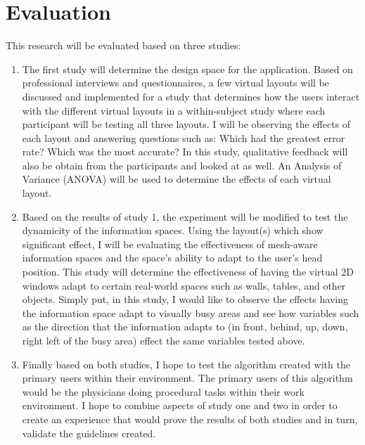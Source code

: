 \section{Evaluation}
\label{sec:evaluation}
This research will be evaluated based on three studies:
\begin{enumerate}
\item The first study will determine the design space for the application. Based on professional interviews and questionnaires, a few virtual layouts will be discussed and implemented for a study that determines how the users interact with the different virtual layouts in a within-subject study where each participant will be testing all three layouts. I will be observing the effects of each layout and answering questions such as: Which had the greatest error rate? Which was the most accurate? In this study, qualitative feedback will also be obtain from the participants and looked at as well. An Analysis of Variance (ANOVA) will be used to determine the effects of each virtual layout.

\item Based on the results of study 1, the experiment will be modified to test the dynamicity of the information spaces. Using the layout(s) which show significant effect, I will be evaluating the effectiveness of mesh-aware information spaces and the space's ability to adapt to the user's head position. This study will determine the effectiveness of having the virtual 2D windows adapt to certain real-world spaces such as walls, tables, and other objects. Simply put, in this study, I would like to observe the effects having the information space adapt to visually busy areas and see how variables such as the direction that the information adapts to (in front, behind, up, down, right left of the busy area) effect the same variables tested above.

\item Finally based on both studies, I hope to test the algorithm created with the primary users within their environment. The primary users of this algorithm would be the physicians doing procedural tasks within their work environment. I hope to combine aspects of study one and two in order to create an experience that would prove the results of both studies and in turn, validate the guidelines created.
\end{enumerate}